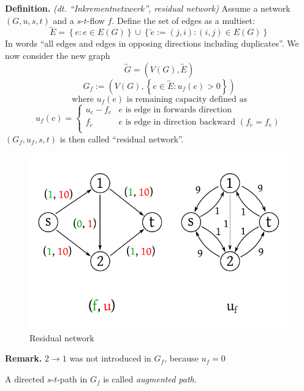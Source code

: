 \documentclass{article}
\newcommand{\set}[1]{\left\{#1\right\}}
\newcommand{\gath}[2]{$#1$-$#2$-path} %
\newcommand{\flow}[2]{$#1$-$#2$-flow}
\begin{document}
\textbf{Definition.} \emph{(dt. ``Inkrementnetzwerk'', residual network)}
  Assume a network $(G, u, s, t)$ and a \flow st $f$. Define the set of edges as a multiset:
  \[
    \overleftrightarrow E = \set{e: e \in E(G)} \cup \set{\overleftarrow e := (j, i): (i, j) \in E(G)}
  \]
  In words ``all edges and edges in opposing directions including duplicates''.
  We now consider the new graph
  \[
    \overleftrightarrow G = (V(G), \overleftrightarrow E)
  \] \[
    G_f := (V(G), \set{e \in \overleftrightarrow E: u_f(e) > 0})
  \] \[
      \text{ where } u_f(e) \text{ is remaining capacity defined as }
  \] \[
      u_f(e) = \left\{\begin{array}{lc}
        u_e - f_e & e \text{ is edge in forwards direction} \\
        f_{\overleftarrow e} & e \text{ is edge in direction backward } (f_{\overleftarrow e} = f_e) \\
      \end{array}\right.
  \]
  $(G_f, u_f, s, t)$ is then called ``residual network''.

\begin{figure}[ht]
 \begin{center}
  \includegraphics{img/residual_graph.pdf}
  \caption{Residual network}
 \end{center}
\end{figure}

\textbf{Remark.} $2\rightarrow 1$ was not introduced in $G_f$, because $u_f = 0$

A directed \gath st in $G_f$ is called \emph{augmented path}.
\end{document}
